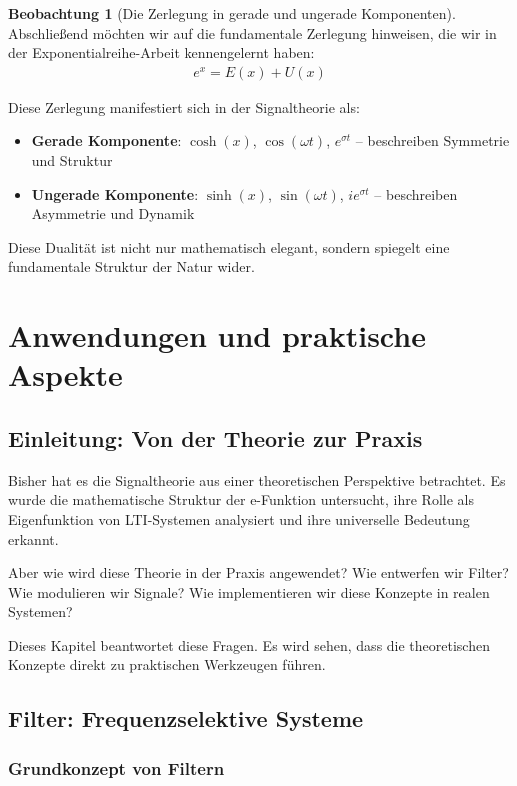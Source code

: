 ﻿\documentclass[a4paper,12pt]{report}
\theoremstyle{definition}
\newtheorem{beobachtung}{Beobachtung}
\begin{document}
	\begin{beobachtung}[Die Zerlegung in gerade und ungerade Komponenten]
		Abschließend möchten wir auf die fundamentale Zerlegung hinweisen, die wir in der Exponentialreihe-Arbeit kennengelernt haben:
		\begin{align}
			e^x = E(x) + U(x)
		\end{align}
		
		Diese Zerlegung manifestiert sich in der Signaltheorie als:
		\begin{itemize}
			\item[-] \textbf{Gerade Komponente}: $\cosh(x)$, $\cos(\omega t)$, $e^{\sigma t}$ -- beschreiben Symmetrie und Struktur
			\item[-] \textbf{Ungerade Komponente}: $\sinh(x)$, $\sin(\omega t)$, $i e^{\sigma t}$ -- beschreiben Asymmetrie und Dynamik
		\end{itemize}
		
		Diese Dualität ist nicht nur mathematisch elegant, sondern spiegelt eine fundamentale Struktur der Natur wider.
	\end{beobachtung}
	
	\chapter{Anwendungen und praktische Aspekte}
	
	\section{Einleitung: Von der Theorie zur Praxis}
	
	Bisher hat es die Signaltheorie aus einer theoretischen Perspektive betrachtet. Es wurde die mathematische Struktur der e-Funktion untersucht, ihre Rolle als Eigenfunktion von LTI-Systemen analysiert und ihre universelle Bedeutung erkannt.
	
	Aber wie wird diese Theorie in der Praxis angewendet? Wie entwerfen wir Filter? Wie modulieren wir Signale? Wie implementieren wir diese Konzepte in realen Systemen?
	
	Dieses Kapitel beantwortet diese Fragen. Es wird sehen, dass die theoretischen Konzepte direkt zu praktischen Werkzeugen führen.
	
	\section{Filter: Frequenzselektive Systeme}
	
	\subsection{Grundkonzept von Filtern}
	
\end{document}
